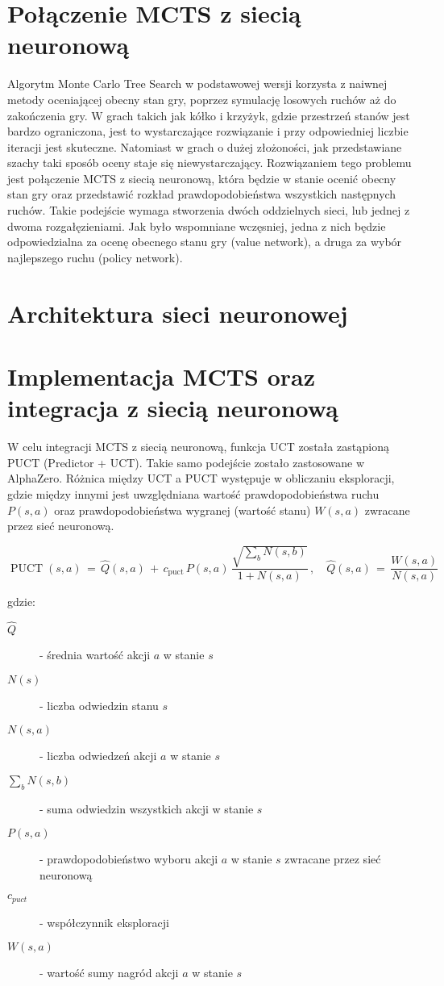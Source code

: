 \section*{Połączenie MCTS z siecią neuronową}
Algorytm Monte Carlo Tree Search w podstawowej wersji korzysta z naiwnej metody oceniającej obecny stan gry, poprzez symulację losowych ruchów aż do zakończenia gry. W grach takich jak kółko i krzyżyk, gdzie przestrzeń stanów jest bardzo ograniczona, jest to wystarczające rozwiązanie i przy odpowiedniej liczbie iteracji jest skuteczne. Natomiast w grach o dużej złożoności, jak przedstawiane szachy taki sposób oceny staje się niewystarczający. Rozwiązaniem tego problemu jest połączenie MCTS z siecią neuronową, która będzie w stanie ocenić obecny stan gry oraz przedstawić rozkład prawdopodobieństwa wszystkich następnych ruchów. Takie podejście wymaga stworzenia dwóch oddzielnych sieci, lub jednej z dwoma rozgałęzieniami. Jak było wspomniane wczęsniej, jedna z nich będzie odpowiedzialna za ocenę obecnego stanu gry (value network), a druga za wybór najlepszego ruchu (policy network).

\section*{Architektura sieci neuronowej}

\section*{Implementacja MCTS oraz integracja z siecią neuronową}
W celu integracji MCTS z siecią neuronową, funkcja UCT została zastąpioną PUCT (Predictor + UCT). Takie samo podejście zostało zastosowane w AlphaZero. Różnica między UCT a PUCT występuje w obliczaniu eksploracji, gdzie między innymi jest uwzględniana wartość prawdopodobieństwa ruchu $P(s,a)$ oraz prawdopodobieństwa wygranej (wartość stanu) $W(s,a)$ zwracane przez sieć neuronową.

\hspace{2cm}

\begin{equation}
\operatorname{PUCT}(s,a) \,=\, \widehat{Q}(s,a) \, + \, c_{\mathrm{puct}}\, P(s,a)\, \frac{\sqrt{\sum_{b} N(s,b)}}{1 + N(s,a)}\, ,
\quad
\widehat{Q}(s,a) \,=\, \dfrac{W(s,a)}{N(s,a)}\,
\end{equation}

\noindent gdzie:
\begin{description}
  \item[$\widehat{Q}$] - średnia wartość akcji $a$ w stanie $s$
  \item[$N(s)$] - liczba odwiedzin stanu $s$
  \item[$N(s,a)$] - liczba odwiedzeń akcji $a$ w stanie $s$
  \item[$\sum_{b} N(s,b)$] - suma odwiedzin wszystkich akcji w stanie $s$
  \item[$P(s,a)$] - prawdopodobieństwo wyboru akcji $a$ w stanie $s$ zwracane przez sieć neuronową
  \item[$c_{puct}$] - współczynnik eksploracji
  \item[$W(s,a)$] - wartość sumy nagród akcji $a$ w stanie $s$
\end{description}

